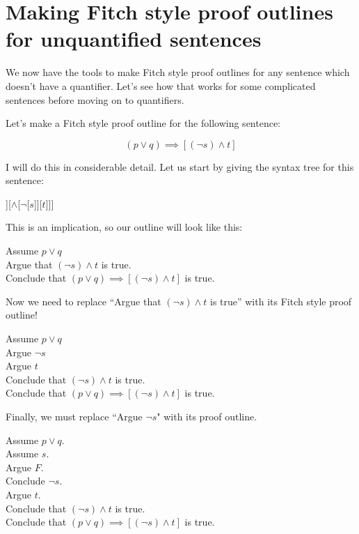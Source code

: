 \documentclass{article}
\begin{document}
\section{Making Fitch style proof outlines for unquantified sentences }

We now have the tools to make Fitch style proof outlines for any sentence which doesn't have a quantifier.  Let's see how that works for some complicated sentences before moving on to quantifiers.

Let's make a Fitch style proof outline for the following sentence:

$$
(p \vee q) \implies [(\neg s) \wedge t]
$$

I will do this in considerable detail.  Let us start by giving the syntax tree for this sentence:

\begin{center}
	\begin{forest}
			[$\implies$[$\vee$[$p$][$q$]][$\wedge$[$\neg$[$s$]][$t$]]]
		\end{forest}
\end{center}

This is an implication, so our outline will look like this:

\begin{fitch*}
	\textrm{Assume $p \vee q$}\\
	\fa \textrm{Argue that $(\neg s) \wedge t$ is true.}\\
	\textrm{Conclude that $(p \vee q) \implies [(\neg s) \wedge t]$ is true.}
\end{fitch*}

 

Now we need to replace ``Argue that $(\neg s) \wedge t$ is true'' with its Fitch style proof outline!

\begin{fitch*}
	\textrm{Assume $p \vee q$}\\
	\fa \textrm{Argue $\neg s$}\\
	\fa \textrm{Argue $t$}\\
	\fa \textrm{Conclude that $(\neg s) \wedge t$ is true.}\\
	\textrm{Conclude that $(p \vee q) \implies [(\neg s) \wedge t]$ is true.}
\end{fitch*}


Finally, we must replace ``Argue $\neg s$" with its proof outline.

\begin{fitch*}
	\textrm{Assume $p \vee q$.}\\
	\fa \textrm{Assume $s$.}\\
	\fa \fa \textrm{Argue $F$.}\\
	\fa \textrm{Conclude $\neg s$.}\\
	\fa \textrm{Argue $t$.}\\
	\fa \textrm{Conclude that $(\neg s) \wedge t$ is true.}\\
	\textrm{Conclude that $(p \vee q) \implies [(\neg s) \wedge t]$ is true.}
\end{fitch*}
\end{document}
